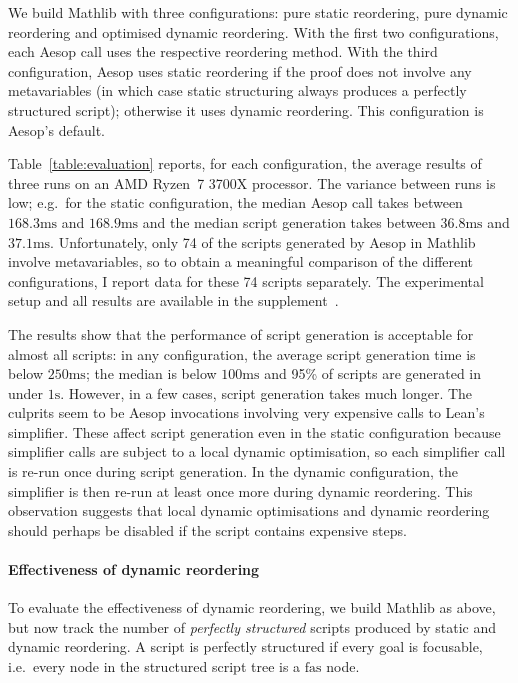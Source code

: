 \documentclass[sigplan,10pt,anonymous,review]{acmart}
\newcommand{\millis}{\ensuremath{\mathrm{ms}}}
\newcommand{\second}{\ensuremath{\mathrm{s}}}
\begin{document}
We build Mathlib with three configurations: pure static reordering, pure dynamic reordering and optimised dynamic reordering.
With the first two configurations, each Aesop call uses the respective reordering method.
With the third configuration, Aesop uses static reordering if the proof does not involve any metavariables (in which case static structuring always produces a perfectly structured script); otherwise it uses dynamic reordering.
This configuration is Aesop's default.

Table~\ref{table:evaluation} reports, for each configuration, the average results of three runs on an AMD Ryzen~7 3700X processor.
The variance between runs is low; e.g.\ for the static configuration, the median Aesop call takes between $168.3\millis$ and $168.9\millis$ and the median script generation takes between $36.8\millis$ and $37.1\millis$.
Unfortunately, only 74 of the scripts generated by Aesop in Mathlib involve metavariables, so to obtain a meaningful comparison of the different configurations, I report data for these 74 scripts separately.
The experimental setup and all results are available in the supplement~\cite{supplement}.

The results show that the performance of script generation is acceptable for almost all scripts: in any configuration, the average script generation time is below $250\millis$; the median is below $100\millis$ and 95\% of scripts are generated in under $1\second$.
However, in a few cases, script generation takes much longer.
The culprits seem to be Aesop invocations involving very expensive calls to Lean's simplifier.
These affect script generation even in the static configuration because simplifier calls are subject to a local dynamic optimisation, so each simplifier call is re-run once during script generation.
In the dynamic configuration, the simplifier is then re-run at least once more during dynamic reordering.
This observation suggests that local dynamic optimisations and dynamic reordering should perhaps be disabled if the script contains expensive steps.

\paragraph{Effectiveness of dynamic reordering}
To evaluate the effectiveness of dynamic reordering, we build Mathlib as above, but now track the number of \emph{perfectly structured} scripts produced by static and dynamic reordering.
A script is perfectly structured if every goal is focusable, i.e.\ every node in the structured script tree is a $\mathrm{fas}$ node.
\end{document}
